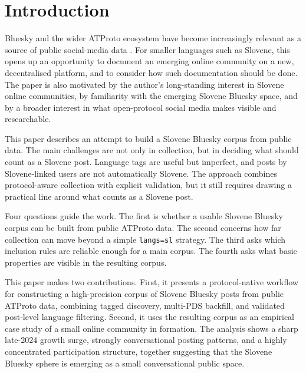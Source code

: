 \section{Introduction}

Bluesky and the wider ATProto ecosystem have become increasingly relevant as a source of public social-media data \parencite{failla2024bluesky,quelle2025bluesky}. For smaller languages such as Slovene, this opens up an opportunity to document an emerging online community on a new, decentralised platform, and to consider how such documentation should be done. The paper is also motivated by the author's long-standing interest in Slovene online communities, by familiarity with the emerging Slovene Bluesky space, and by a broader interest in what open-protocol social media makes visible and researchable.

This paper describes an attempt to build a Slovene Bluesky corpus from public data. The main challenges are not only in collection, but in deciding what should count as a Slovene post. Language tags are useful but imperfect, and posts by Slovene-linked users are not automatically Slovene. The approach combines protocol-aware collection with explicit validation, but it still requires drawing a practical line around what counts as a Slovene post.

Four questions guide the work. The first is whether a usable Slovene Bluesky corpus can be built from public ATProto data. The second concerns how far collection can move beyond a simple \texttt{langs=sl} strategy. The third asks which inclusion rules are reliable enough for a main corpus. The fourth asks what basic properties are visible in the resulting corpus.

This paper makes two contributions. First, it presents a protocol-native workflow for constructing a high-precision corpus of Slovene Bluesky posts from public ATProto data, combining tagged discovery, multi-PDS backfill, and validated post-level language filtering. Second, it uses the resulting corpus as an empirical case study of a small online community in formation. The analysis shows a sharp late-2024 growth surge, strongly conversational posting patterns, and a highly concentrated participation structure, together suggesting that the Slovene Bluesky sphere is emerging as a small conversational public space.
